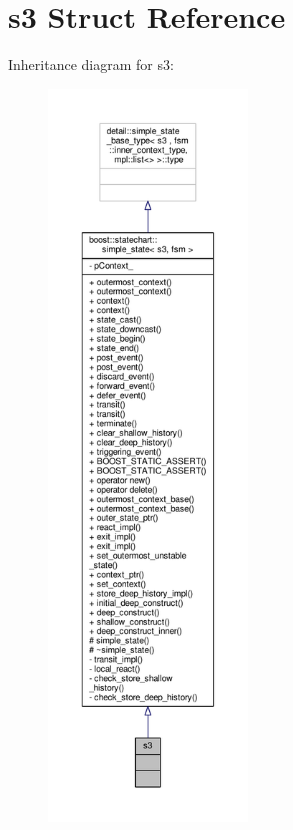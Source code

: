 \hypertarget{structs3}{}\section{s3 Struct Reference}
\label{structs3}


Inheritance diagram for s3\+:
\nopagebreak
\begin{figure}[H]
\begin{center}
\leavevmode
\includegraphics[height=550pt]{structs3__inherit__graph}
\end{center}
\end{figure}


